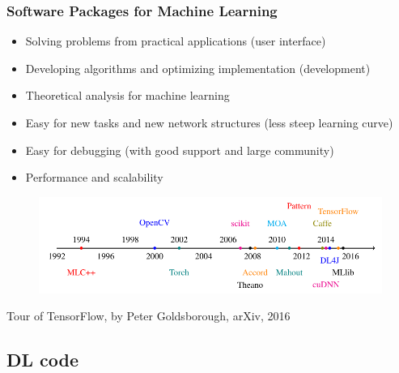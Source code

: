 
\begin{frame}
  \MyLogo
  \frametitle{Software Packages for Machine Learning}  
\small

\begin{itemize}
\item Solving problems from practical applications (user interface)
\item Developing algorithms and optimizing implementation (development)
\item Theoretical analysis for machine learning
\end{itemize}

\begin{itemize}
\item Easy for new tasks and new network structures (less steep learning curve)
\item Easy for debugging (with good support and large community)
\item Performance and scalability
\end{itemize}

\vskip -12pt
\begin{figure}[htbp] %
   \centering
   \includegraphics[width=0.9\linewidth]{figures/ML.pdf} 
\end{figure}

\begin{center}
{\color{red} \scriptsize
Tour of TensorFlow, by Peter Goldsborough, arXiv, 2016}
\end{center}


\end{frame}

\subsection{DL code}

